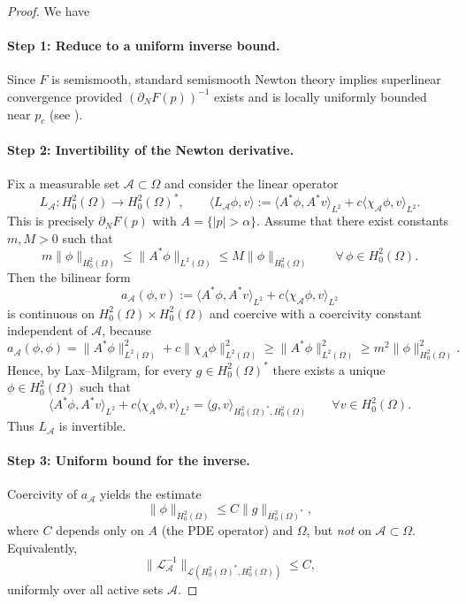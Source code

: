 \documentclass[11pt,a4paper]{article}
\begin{document}
\begin{proof}
We have  

\paragraph{Step 1: Reduce to a uniform inverse bound.}
Since $F$ is semismooth, standard semismooth Newton theory implies superlinear convergence provided
$(\partial_N F(p))^{-1}$ exists and is locally uniformly bounded near $p_c$
(see \cite[Thm.~8.16]{ItoKunisch2008}).

\paragraph{Step 2: Invertibility of the Newton derivative.}
Fix a measurable set $\mathcal{A}\subset\Omega$ and
consider the linear operator
\[
L_\mathcal{A} : H^2_0(\Omega)\to H^2_0(\Omega)^*,
\qquad
\langle L_\mathcal{A}\phi,v\rangle
:=
\langle A^*\phi,A^*v\rangle_{L^2}
+
c\langle \chi_\mathcal{A}\phi,v\rangle_{L^2}.
\]
This is precisely $\partial_NF(p)$ with $A=\{|p|>\alpha\}$.
Assume that there exist constants $m,M>0$ such that
\[
m\|\phi\|_{H^2_0(\Omega)}
\le
\|A^*\phi\|_{L^2(\Omega)}
\le
M\|\phi\|_{H^2_0(\Omega)}
\qquad\forall\,\phi\in H^2_0(\Omega).
\]
Then the bilinear form
\[
a_\mathcal{A}(\phi,v):=\langle A^*\phi,A^*v\rangle_{L^2}+c\langle \chi_\mathcal{A}\phi,v\rangle_{L^2}
\]
is continuous on $H^2_0(\Omega)\times H^2_0(\Omega)$ and coercive with a coercivity constant independent of $\mathcal{A}$, because
\[
a_\mathcal{A}(\phi,\phi)
=
\|A^*\phi\|_{L^2(\Omega)}^2+c\|\chi_A\phi\|_{L^2(\Omega)}^2
\ge
\|A^*\phi\|_{L^2(\Omega)}^2
\ge
m^2\|\phi\|_{H^2_0(\Omega)}^2.
\]
Hence, by Lax--Milgram, for every $g\in H^2_0(\Omega)^*$ there exists a unique
$\phi\in H^2_0(\Omega)$ such that
\begin{equation}
\langle A^*\phi,A^*v\rangle_{L^2}
+
c\langle \chi_A\phi,v\rangle_{L^2}
=
\langle g,v\rangle_{H^2_0(\Omega)^*,H^2_0(\Omega)}
\qquad \forall v\in H^2_0(\Omega).
\label{eq:newton_linear_problem}
\end{equation}
Thus $L_\mathcal{A}$ is invertible.

\paragraph{Step 3: Uniform bound for the inverse.}
Coercivity of $a_\mathcal{A}$ yields the estimate
\[
\|\phi\|_{H_0^2(\Omega)} \le C \|g\|_{H_0^2(\Omega)^\ast},
\]
where $C$ depends only on $A$ (the PDE operator) and $\Omega$, but \emph{not} on $\mathcal{A}\subset\Omega$.
Equivalently,
\[
\|\mathcal{L}_\mathcal{A}^{-1}\|_{\mathcal{L}(H_0^2(\Omega)^\ast,H_0^2(\Omega))}\le C,
\]
uniformly over all active sets $\mathcal{A}$.


\end{proof}
\end{document}
